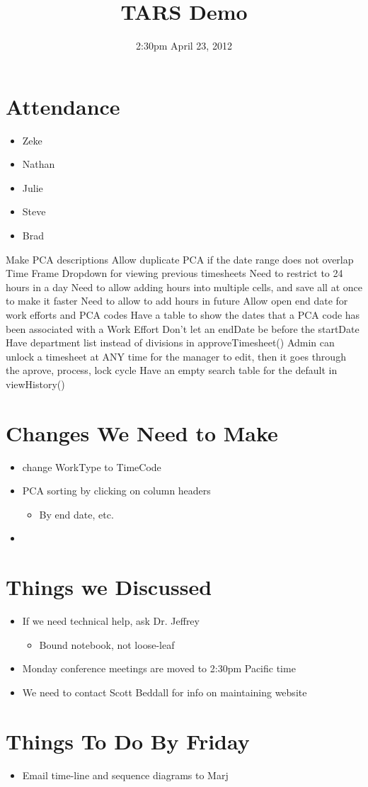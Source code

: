 \documentclass{article}
\begin{document}
\title{TARS Demo}
\date{2:30pm April 23, 2012}
\maketitle

\section{Attendance}
\begin{itemize}
\item Zeke
\item Nathan 
\item Julie
\item Steve
\item Brad
\end{itemize}

 
 
    
 Make PCA descriptions 
 Allow duplicate PCA if the date range does not overlap
 Time Frame Dropdown for viewing previous timesheets
 Need to restrict to 24 hours in a day
 Need to allow adding hours into multiple cells, and save all at once to make it faster
 Need to allow to add hours in future
 Allow open end date for work efforts and PCA codes
 Have a table to show the dates that a PCA code has been associated with a Work Effort
 Don't let an endDate be before the startDate
 Have department list instead of divisions in approveTimesheet()
 Admin can unlock a timesheet at ANY time for the manager to edit, then it goes through the aprove, process, lock cycle
 Have an empty search table for the default in viewHistory()


\section{Changes We Need to Make}
\begin{itemize}
\item change WorkType to TimeCode
\item PCA sorting by clicking on column headers
	\begin{itemize}
	\item By end date, etc.
	\end{itemize}
\item 
\end{itemize}

\section{Things we Discussed}
\begin{itemize}
\item If we need technical help, ask Dr. Jeffrey

	\begin{itemize}
	\item Bound notebook, not loose-leaf
	\end{itemize}
\item Monday conference meetings are moved to 2:30pm Pacific time
\item We need to contact Scott Beddall for info on maintaining website
\end{itemize}

\section{Things To Do By Friday}
\begin{itemize}
\item Email time-line and sequence diagrams to Marj 
\end{itemize}
\end{document}
